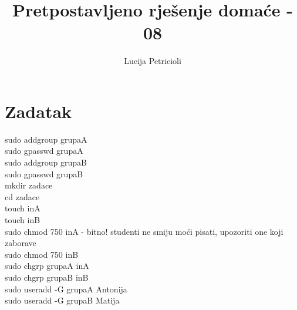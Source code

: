 \documentclass[12pt,a4paper]{article}
\begin{document}
	\title{Pretpostavljeno rješenje domaće - 08}
	\maketitle
	\author{Lucija Petricioli}
	\section{Zadatak}
	sudo addgroup grupaA \\
	sudo gpasswd grupaA \\
	sudo addgroup grupaB \\
	sudo gpasswd grupaB \\
	mkdir zadace \\
	cd zadace \\
	touch inA \\
	touch inB \\
	sudo chmod 750 inA - bitno! studenti ne smiju moći pisati, upozoriti one koji zaborave \\
	sudo chmod 750 inB \\
	sudo chgrp grupaA inA \\
	sudo chgrp grupaB inB \\
	sudo useradd -G grupaA Antonija \\
	sudo useradd -G grupaB Matija
	 
	
\end{document}
